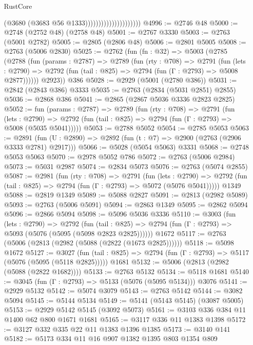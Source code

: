 \begin{lexlean}{RustCore}
\begin{coremodule}
                                          (@3680 (@3683 @56 @1333)))))))))))))))))))))
@4996 := @2746 @48
@5000 := @2748 (@2752 @48) (@2758 @48)
@5001 := @2767 @3330
@5003 := @2763 (@5001 @2782)
@5005 := @2805 (@2806 @48)
@5006 := @2801 @5005
@5008 := @2763 (@5006 @2830)
@5025 := @2762
    (fun (fn : @32) =>
    @5003
      (@2785
        (@2788
          (fun (params : @2787) =>
          @2789
            (fun (rty : @708) =>
            @2791
              (fun (lets : @2790) =>
              @2792 (fun (tail : @825) => @2794 (fun (Γ : @2793) => @5008 @2877))))))
        @2923))
    @386
@5028 := @2929 (@5001 (@2780 @386))
@5031 := @2842 (@2843 @386) @3333
@5035 := @2763 (@2834 (@5031 @2851) @2855)
@5036 := @2868 @386
@5041 := @2865 (@2867 @5036 @3336 @2823 @2825)
@5052 := fun (params : @2787) =>
  @2789
    (fun (rty : @708) =>
    @2791
      (fun (lets : @2790) =>
      @2792 (fun (tail : @825) => @2794 (fun (Γ : @2793) => @5008 (@5035 @5041)))))
@5053 := @2788 @5052
@5054 := @2785 @5053
@5063 := @2891 (fun (U : @2890) => @2892 (fun (t : @7) => @2900 (@2763 (@2906 @3333 @2781) @2917)))
@5066 := @5028 (@5054 @5063) @3331
@5068 := @2748 @5053 @5063
@5070 := @2978 @5052 @786
@5072 := @2763 (@5006 @2984)
@5073 := @5031 @2987
@5074 := @2834 @5073
@5076 := @2763 (@5074 @2855)
@5087 := @2981
    (fun (rty : @708) =>
    @2791
      (fun (lets : @2790) =>
      @2792 (fun (tail : @825) => @2794 (fun (Γ : @2793) => @5072 (@5076 @5041)))))
    @1349
@5088 := @2819 @1349
@5089 := @5088 @2827
@5091 := @2813 (@2982 @5089)
@5093 := @2763 (@5006 @5091)
@5094 := @2863 @1349
@5095 := @2862 @5094
@5096 := @2866 @5094
@5098 := @5096 @5036 @3336
@5110 := @3003
    (fun (lets : @2790) =>
    @2792
      (fun (tail : @825) => @2794 (fun (Γ : @2793) => @5093 (@5076 (@5095 (@5098 @2823 @2825))))))
    @1672
@5117 := @2763 (@5006 (@2813 (@2982 (@5088 (@2822 (@1673 @2825))))))
@5118 := @5098 @1672
@5127 := @3027
    (fun (tail : @825) => @2794 (fun (Γ : @2793) => @5117 (@5076 (@5095 (@5118 @2825)))))
    @1681
@5132 := @5006 (@2813 (@2982 (@5088 (@2822 @1682))))
@5133 := @2763 @5132
@5134 := @5118 @1681
@5140 := @3045 (fun (Γ : @2793) => @5133 (@5076 (@5095 @5134))) @3076
@5141 := @2929 @5132
@5142 := @5074 @3079
@5143 := @2763 @5142
@5144 := @3082 @5094
@5145 := @5144 @5134
@5149 := @5141 (@5143 @5145) (@3087 @5005)
@5153 := @2929 @5142 @5145 (@3092 @5073)
@5161 := @3103 @336 @384 @11 @1400 @62 @800 @1671 @1681
@5165 := @3117 @336 @11 @1383 @1398
@5172 := @3127 @332 @335 @22 @11 @1383 @1396 @1385
@5173 := @3140 @141
@5182 := @5173 @334 @11 @16 @907 @1382 @1395 @803 @1354 @809

\end{coremodule}
\end{lexlean}

